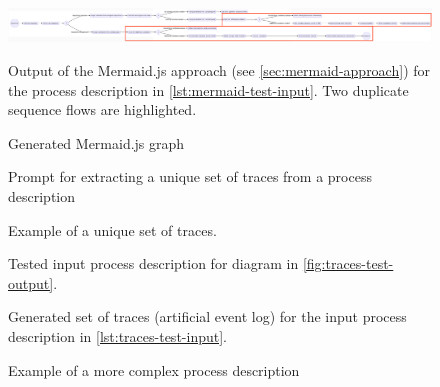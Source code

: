 \begin{landscape}
    \begin{figure}[h]
        \centering
        \includegraphics[width=\textheight,keepaspectratio]{../assets/images/Mermaid Test Output.png}
        \caption{Generated Mermaid.js graph}
        \label{fig:mermaid-test-output}

        \medskip
        \small
        Output of the Mermaid.js approach (see \autoref{sec:mermaid-approach}) for the process description in \autoref{lst:mermaid-test-input}. Two duplicate sequence flows are highlighted.
    \end{figure}
\end{landscape}

\begin{figure}[h]
    
    \caption{Prompt for extracting a unique set of \glspl{trace} from a process description}
    \label{lst:traces-prompt}
\end{figure}

\begin{figure}[h]
    
    \caption{Example of a unique set of \glspl{trace}.}
    \label{lst:traces-example}
\end{figure}

\begin{figure}[h]
    
    \caption{Tested input process description for diagram in \autoref{fig:traces-test-output}.}
    \label{lst:traces-test-input}
\end{figure}

\begin{figure}[h]
    
    \caption{Generated set of traces (artificial \gls{event log}) for the input process description in \autoref{lst:traces-test-input}.}
    \label{lst:traces-test-traces}
\end{figure}

\begin{figure}[h]
    
    \caption{Example of a more complex process description}
    \label{lst:hard-description}
\end{figure}